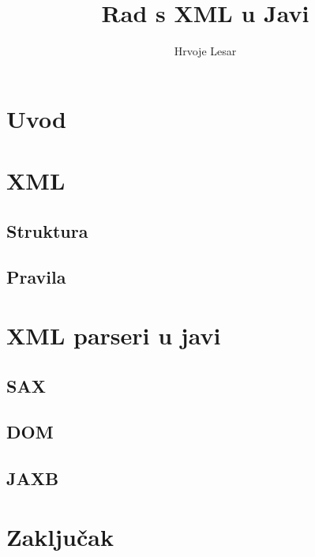 \documentclass[]{foi}
\title{Rad s XML u Javi}
\author{Hrvoje Lesar}
\begin{document}
\maketitle

\tableofcontents

\makeatletter {} \makeatother
\pagestyle{plain}

\chapter{Uvod}

\chapter{XML}
\section{Struktura}
\section{Pravila}

\chapter{XML parseri u javi}
\section{SAX}
\section{DOM}
\section{JAXB}

\chapter{Zaključak}

\makebackmatter
\end{document}

